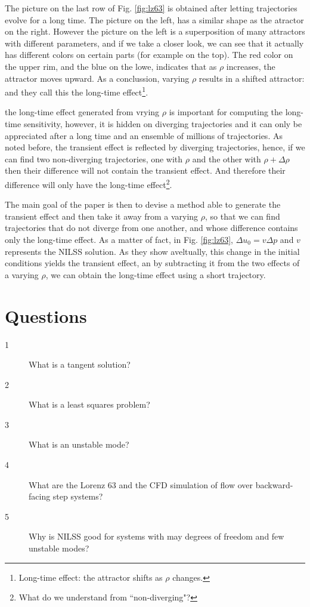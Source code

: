 \documentclass[12pt,twoside,a4paper]{article} %
\begin{document}
The picture on the last row of Fig. \ref{fig:lz63} is obtained after letting trajectories evolve for a long time. The picture on the left, has a similar shape as the atractor on the right. However the picture on the left is a superposition of many attractors with different parameters, and if we take a closer look, we can see that it actually has different colors on certain parts (for example on the top). The red color on the upper rim, and the blue on the lowe, indicates that as $\rho$ increases, the attractor moves upward. As a conclussion, varying $\rho$ results in a shifted attractor: and they call this the long-time effect\footnote{Long-time effect: the attractor shifts as $\rho$ changes.}.

the long-time effect generated from vrying $\rho$ is important for computing the long-time sensitivity, however, it is hidden on diverging trajectories and it can only be appreciated after a long time and an ensemble of millions of trajectories. As noted before, the transient effect is reflected by diverging trajectories, hence, if we can find two non-diverging trajectories, one with $\rho$ and the other with $\rho+\Delta \rho$ then their difference will not contain the transient effect. And therefore their difference will only have the long-time effect\footnote{What do we understand from ``non-diverging"?}.

The main goal of the paper is then to devise a method able to generate the transient effect and then take it away from a varying $\rho$, so that we can find trajectories that do not diverge from one another, and whose difference contains only the long-time effect. As a matter of fact, in Fig. \ref{fig:lz63}, $\Delta u_0 = v\Delta p$ and $v$ represents the NILSS solution. As they show aveltually, this change in the initial conditions yields the transient effect, an by subtracting it from the two effects of a varying $\rho$, we can obtain the long-time effect using a short trajectory.

\section{Questions}
\begin{description}
  \item [1] What is a tangent solution?
  \item [2] What is a least squares problem?
  \item [3] What is an unstable mode?
  \item [4] What are the Lorenz 63 and the CFD simulation of flow over backward-facing step systems?
  \item [5] Why is NILSS good for systems with may degrees of freedom and few unstable modes?
\end{description}
\newpage
\end{document}
